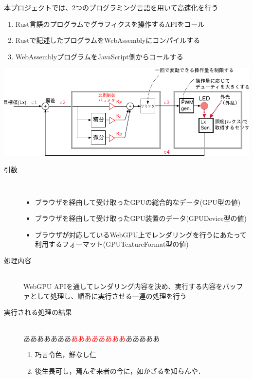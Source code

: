 \begin{minipage}[t]{0.4\textwidth}\vspace{0pt}
本プロジェクトでは、2つのプログラミング言語を用いて高速化を行う

\begin{enumerate}[parsep=-0.5\zh]
	\item Rust言語のプログラムでグラフィクスを操作するAPIをコール
	\item Rustで記述したプログラムをWebAssemblyにコンパイルする
	\item WebAssemblyプログラムをJavaScript側からコールする
\end{enumerate}
\end{minipage}
\begin{minipage}[t]{0.6\textwidth}\vspace{0pt}
\begin{center}
\includegraphics[keepaspectratio, width=.9\linewidth,trim={100mm 0mm 0mm 15mm},clip]{fig/system.pdf}
\end{center}
\end{minipage}

\begin{description}
	\item[引数]~\\
	\begin{itemize}
		\item ブラウザを経由して受け取ったGPUの総合的なデータ(GPU型の値)
		\item ブラウザを経由して受け取ったGPU装置のデータ(GPUDevice型の値)
		\item ブラウザが対応しているWebGPU上でレンダリングを行うにあたって利用するフォーマット(GPUTextureFormat型の値)
	\end{itemize}
	\newpage
	\item[処理内容]~\\
	WebGPU APIを通してレンダリング内容を決め、実行する内容をバッファとして処理し、順番に実行させる一連の処理を行う
	\item[実行される処理の結果]~\\
	あああああああ\textcolor{red}{ああああああああ}あああああ
	\begin{enumerate}
		\item 巧言令色，鮮なし仁
		\item 後生畏可し，焉んぞ来者の今に，如かざるを知らんや．
	\end{enumerate}
\end{description}
\newpage

